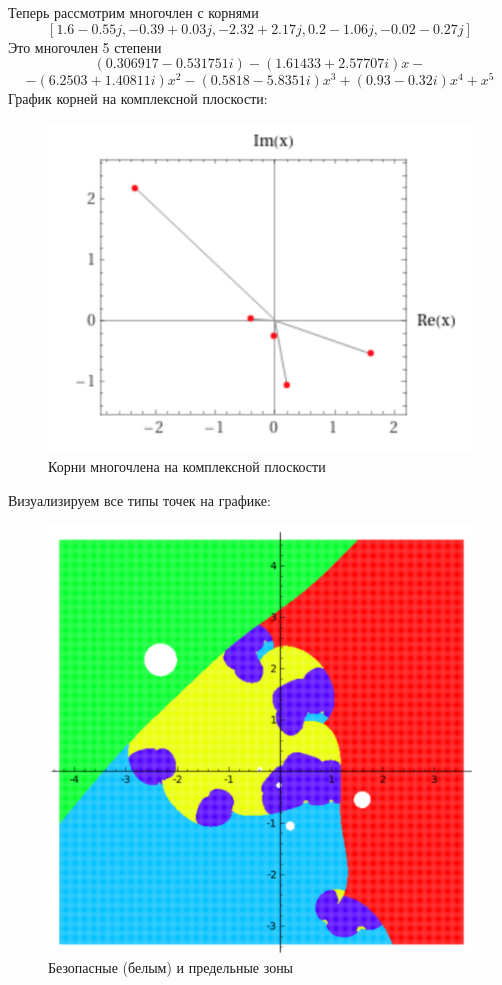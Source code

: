 \documentclass[a4paper,12pt]{article}
\begin{document}
Теперь рассмотрим многочлен с корнями $$[1.6-0.55j, -0.39+0.03j, -2.32+2.17j, 0.2-1.06j, -0.02-0.27j]$$ Это многочлен 5 степени $$(0.306917 - 0.531751 i)-(1.61433 + 2.57707 i) x-$$ $$-(6.2503 + 1.40811 i) x^2 - (0.5818 - 5.8351 i) x^3 + (0.93 - 0.32 i) x^4 + x^5$$
График корней на комплексной плоскости:
\begin{figure}[hbt!]
    \centering
    \includegraphics{images/roots_on_a_plane.png}
    \caption{Корни многочлена на комплексной плоскости}
    \label{fig:enter-label}
\end{figure}
Визуализируем все типы точек на графике:
\newpage
\begin{figure}[hbt!]
    \centering
    \includegraphics[width=0.75\linewidth]{images/fig1.png}
    \caption{Безопасные (белым) и предельные зоны}
\end{figure}
\end{document}

